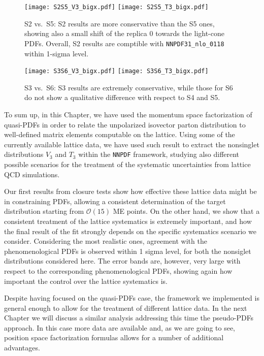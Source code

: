 \begin{figure}[h]
    \begin{center}
    \texttt{[image: S2S5\_V3\_bigx.pdf]}  
	\texttt{[image: S2S5\_T3\_bigx.pdf]}  
	\caption{S2 vs.\ S5: S2 results are more conservative than the S5 ones,
        showing also a small shift of the replica 0 towards the light-cone PDFs.
        Overall, S2 results are comptible with {\tt NNPDF31\_nlo\_0118} within
        1-sigma level.}
    \label{fig:5}
    \end{center}
\end{figure}

\begin{figure}[h]
    \begin{center}
	\texttt{[image: S3S6\_V3\_bigx.pdf]}  
	\texttt{[image: S3S6\_T3\_bigx.pdf]}  
	\caption{S3 vs.\ S6: S3 results are extremely conservative, while those for S6
        do not show a qualitative difference with respect to S4 and S5.}
    \label{fig:6}
    \end{center}
\end{figure}


To sum up, in this Chapter, we have used the momentum space factorization of quasi-PDFs in order to relate
the unpolarized isovector parton distribution to well-defined matrix elements
computable on the lattice. Using some of the currently available lattice data,
we have used such result to extract the nonsinglet distributions $V_3$ and $T_3$
within the {\tt NNPDF} framework, studying also different possible scenarios for
the treatment of the systematic uncertainties from lattice QCD simulations.

Our first results from closure tests show how effective these lattice data might
be in constraining PDFs, allowing a consistent determination of the target
distribution starting from $\mathcal{O}\left(15\right)$ ME points. On the other
hand, we show that a consistent treatment of the lattice systematics is
extremely important, and how the final result of the fit strongly depends on the
specific systematics scenario we consider. Considering the most realistic ones,
agreement with the phenomenological PDFs is observed within 1 sigma level, for
both the nonsiglet distributions considered here. The error bands are, however,
very large with respect to the corresponding phenomenological PDFs, showing again how
important the control over the lattice systematics is. 

Despite having focused on the quasi-PDFs case, the framework we
implemented is general enough to allow for the treatment of different lattice data. 
In the next Chapter we will discuss a similar analysis addressing this time the pseudo-PDFs 
approach. In this case more data are available and, as we are going to see, 
position space factorization formulas allows for a number of additional advantages.






